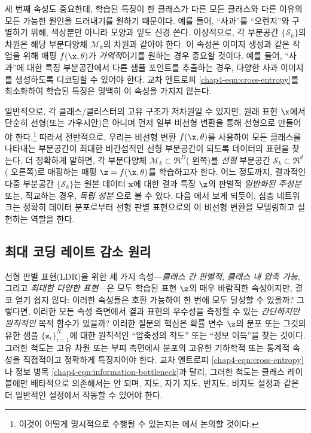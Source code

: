 \documentclass[../../book-main_ko.tex]{subfiles}
\begin{document}
세 번째 속성도 중요한데, 학습된 특징이 한 클래스가 다른 모든 클래스와 다른 이유의 모든 가능한 원인을 드러내기를 원하기 때문이다. 예를 들어, ``사과''를 ``오렌지''와 구별하기 위해, 색상뿐만 아니라 모양과 잎도 신경 쓴다. 이상적으로, 각 부분공간 $\{\mathcal{S}_k\}$의 차원은 해당 부분다양체 $\mathcal{M}_k$의 차원과 같아야 한다. 이 속성은 이미지 생성과 같은 작업을 위해 매핑 $f(\x,\theta)$가 {\em 가역적}이기를 원하는 경우 중요할 것이다. 예를 들어, ``사과''에 대한 특징 부분공간에서 다른 샘플 포인트를 추출하는 경우, 다양한 사과 이미지를 생성하도록 디코딩할 수 있어야 한다. 교차 엔트로피 \eqref{chap4-eqn:cross-entropy}를 최소화하여 학습된 특징은 명백히 이 속성을 가지지 않는다.

일반적으로, 각 클래스/클러스터의 고유 구조가 저차원일 수 있지만, 원래 표현 $\x$에서 단순히 선형(또는 가우시안)은 아니며 먼저 일부 비선형 변환을 통해 선형으로 만들어야 한다.\footnote{이것이 어떻게 명시적으로 수행될 수 있는지는 에서 논의할 것이다.} 따라서 전반적으로, 우리는 비선형 변환 $f(\x,\theta)$를 사용하여 모든 클래스를 나타내는 부분공간이 최대한 비간섭적인 선형 부분공간이 되도록 데이터의 표현을 찾는다. 더 정확하게 말하면, 각 부분다양체 $\mathcal{M}_k \subset \Re^D$( 왼쪽)를 {\em 선형} 부분공간 $\mathcal{S}_k \subset \Re^d$( 오른쪽)로 매핑하는 매핑 {$\z = f(\x,\theta)$}를 학습하고자 한다. 어느 정도까지, 결과적인 다중 부분공간 $\{\mathcal{S}_k\}$는 원본 데이터 $\bm x$에 대한 결과 특징 $\z$의 판별적 {\em 일반화된 주성분} \cite{GPCA} 또는, 직교하는 경우, {\em 독립 성분} \cite{hyvarinen2000independent}으로 볼 수 있다.
다음 에서 보게 되듯이, 심층 네트워크는 정확히 데이터 분포로부터 선형 판별 표현으로의 이 비선형 변환을 모델링하고 실현하는 역할을 한다.

\subsection{최대 코딩 레이트 감소 원리}\label{subsec:MCR2}

선형 판별 표현(LDR)을 위한 세 가지 속성---{\em 클래스 간 판별적}, {\em 클래스 내 압축 가능}, 그리고 {\em 최대한 다양한 표현}---은 모두 학습된 표현 $\z$의 매우 바람직한 속성이지만, 결코 얻기 쉽지 않다: 이러한 속성들은 호환 가능하여 한 번에 모두 달성할 수 있을까? 그렇다면, 이러한 모든 속성 측면에서 결과 표현의 우수성을 측정할 수 있는 {\em 간단하지만 원칙적인} 목적 함수가 있을까? 이러한 질문의 핵심은 확률 변수 $\z$의 분포 또는 그것의 유한 샘플 $\{\bm z_i\}_{i=1}^N$에 대한 원칙적인 ``압축성의 척도'' 또는 ``정보 이득''을 {찾는 것이다}. 그러한 척도는 고유 차원 또는 {부피} 측면에서 분포의 고유한 기하학적 또는 통계적 속성을 직접적이고 정확하게 특징지어야 한다. 교차 엔트로피 \eqref{chap4-eqn:cross-entropy}나 정보 병목 \eqref{chap4-eqn:information-bottleneck}과 달리, 그러한 척도는 클래스 레이블에만 배타적으로 의존해서는 안 되며, 지도, 자기 지도, 반지도, 비지도 설정과 같은 더 일반적인 설정에서 작동할 수 있어야 한다.
\end{document}
